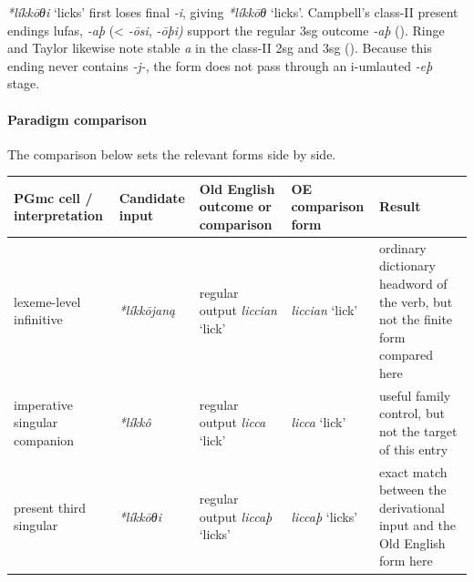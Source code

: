 \documentclass[
  british,
  a4paper,
]{article}
\newcounter{none} %
\providecommand{\Recon}[1]{\emph{*#1}}
\begin{document}
\Recon{líkkōθi} `licks' first loses final \emph{-i}, giving
\Recon{líkkōθ} `licks'. Campbell's class-II present endings lufas,
\emph{-aþ} (\textless{} \emph{-ōsi}, \emph{-ōþi)} support the regular
3sg outcome \emph{-aþ} (). Ringe and Taylor likewise note stable \emph{a} in the class-II
2sg and 3sg ().
Because this ending never contains \emph{-j-}, the form does not pass
through an i-umlauted \emph{-eþ} stage.

\paragraph{Paradigm comparison}\label{paradigm-comparison-24}

The comparison below sets the relevant forms side by side.

{\def\LTcaptype{none} %
\begin{longtable}[]{@{}
  >{\raggedright\arraybackslash}p{}
  >{\raggedright\arraybackslash}p{}
  >{\raggedright\arraybackslash}p{}
  >{\raggedright\arraybackslash}p{}
  >{\raggedright\arraybackslash}p{}@{}}
\toprule\noalign{}
\begin{minipage}[b]{\linewidth}\raggedright
PGmc cell / interpretation
\end{minipage} & \begin{minipage}[b]{\linewidth}\raggedright
Candidate input
\end{minipage} & \begin{minipage}[b]{\linewidth}\raggedright
Old English outcome or comparison
\end{minipage} & \begin{minipage}[b]{\linewidth}\raggedright
OE comparison form
\end{minipage} & \begin{minipage}[b]{\linewidth}\raggedright
Result
\end{minipage} \\
\midrule\noalign{}
\endhead
\bottomrule\noalign{}
\endlastfoot
lexeme-level infinitive & {\emph{*líkkōjaną}} & regular output
{\emph{liccian}} `lick' & {\emph{liccian}} `lick' & ordinary dictionary
headword of the verb, but not the finite form compared here \\
imperative singular companion & {\emph{*líkkô}} & regular output
{\emph{licca}} `lick' & {\emph{licca}} `lick' & useful family control,
but not the target of this entry \\
present third singular & {\emph{*líkkōθi}} & regular output
{\emph{liccaþ}} `licks' & {\emph{liccaþ}} `licks' & exact match between
the derivational input and the Old English form here \\
\end{longtable}
}
\end{document}
